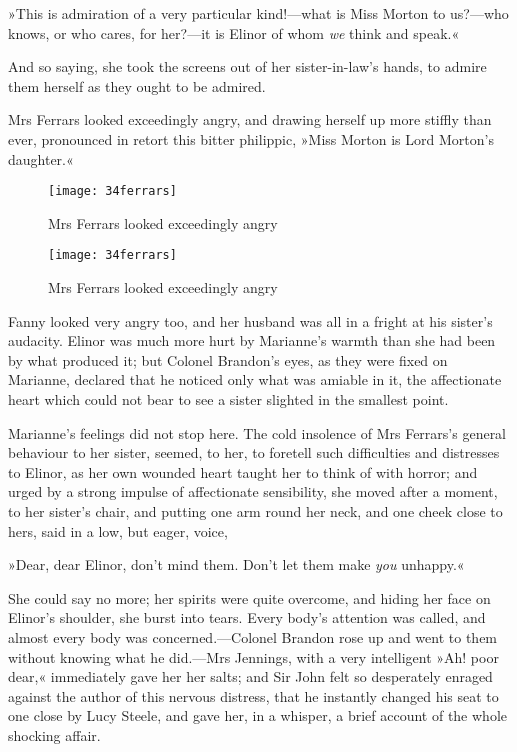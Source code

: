 »This is admiration of a very particular kind!—what is Miss Morton to us?—who knows, or who cares, for her?—it is Elinor of whom \textit{we} think and speak.«

And so saying, she took the screens out of her sister-in-law’s hands, to admire them herself as they ought to be admired.

Mrs Ferrars looked exceedingly angry, and drawing herself up more stiffly than ever, pronounced in retort this bitter philippic, »Miss Morton is Lord Morton’s daughter.«

\begin{a4}
	\begin{figure}[tbph]
		\centering
		\texttt{[image: 34ferrars]}
		\caption{Mrs Ferrars looked exceedingly angry}
	\end{figure}
\end{a4}

\begin{letter}
	\begin{figure}[tbph]
		\centering
		\texttt{[image: 34ferrars]}
		\caption{Mrs Ferrars looked exceedingly angry}
	\end{figure}
\end{letter}

Fanny looked very angry too, and her husband was all in a fright at his sister’s audacity. Elinor was much more hurt by Marianne’s warmth than she had been by what produced it; but Colonel Brandon’s eyes, as they were fixed on Marianne, declared that he noticed only what was amiable in it, the affectionate heart which could not bear to see a sister slighted in the smallest point.

Marianne’s feelings did not stop here. The cold insolence of Mrs Ferrars’s general behaviour to her sister, seemed, to her, to foretell such difficulties and distresses to Elinor, as her own wounded heart taught her to think of with horror; and urged by a strong impulse of affectionate sensibility, she moved after a moment, to her sister’s chair, and putting one arm round her neck, and one cheek close to hers, said in a low, but eager, voice,

»Dear, dear Elinor, don’t mind them. Don’t let them make \textit{you} unhappy.«

She could say no more; her spirits were quite overcome, and hiding her face on Elinor’s shoulder, she burst into tears. Every body’s attention was called, and almost every body was concerned.—Colonel Brandon rose up and went to them without knowing what he did.—Mrs Jennings, with a very intelligent »Ah! poor dear,« immediately gave her her salts; and Sir John felt so desperately enraged against the author of this nervous distress, that he instantly changed his seat to one close by Lucy Steele, and gave her, in a whisper, a brief account of the whole shocking affair.

